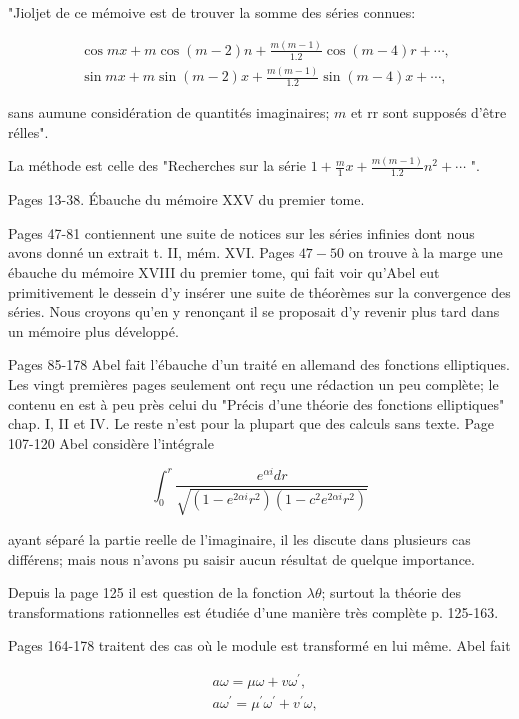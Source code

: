 \documentclass{article}
\begin{document}
"Jioljet de ce mémoive est de trouver la somme des séries connues:

\[
\begin{aligned}
& \cos m x+m \cos (m-2) n+\frac{m(m-1)}{1.2} \cos (m-4) r+\cdots, \\
& \sin m x+m \sin (m-2) x+\frac{m(m-1)}{1.2} \sin (m-4) x+\cdots,
\end{aligned}
\]

sans aumune considération de quantités imaginaires; \(m\) et rr sont supposés d'être rélles".

La méthode est celle des "Recherches sur la série \(1+\frac{m}{1} x+\frac{m(m-1)}{1.2} n^{2}+\cdots\) ".

Pages 13-38. Ébauche du mémoire XXV du premier tome.

Pages 47-81 contiennent une suite de notices sur les séries infinies dont nous avons donné un extrait t. II, mém. XVI. Pages \(47-50\) on trouve à la marge une ébauche du mémoire XVIII du premier tome, qui fait voir qu'Abel eut primitivement le dessein d'y insérer une suite de théorèmes sur la convergence des séries. Nous croyons qu'en y renonçant il se proposait d'y revenir plus tard dans un mémoire plus développé.

Pages 85-178 Abel fait l'ébauche d'un traité en allemand des fonctions elliptiques. Les vingt premières pages seulement ont reçu une rédaction un peu complète; le contenu en est à peu près celui du "Précis d'une théorie des fonctions elliptiques" chap. I, II et IV. Le reste n'est pour la plupart que des calculs sans texte. Page 107-120 Abel considère l'intégrale

\[
\int_{0}^{r} \frac{e^{\alpha i} d r}{\sqrt{\left(1-e^{2 \alpha i} r^{2}\right)\left(1-c^{2} e^{2 \alpha i} r^{2}\right)}}
\]

ayant séparé la partie reelle de l'imaginaire, il les discute dans plusieurs cas différens; mais nous n'avons pu saisir aucun résultat de quelque importance.

Depuis la page 125 il est question de la fonction \(\lambda \theta\); surtout la théorie des transformations rationnelles est étudiée d'une manière très complète p. 125-163.

Pages 164-178 traitent des cas où le module est transformé en lui même. Abel fait

\[
\begin{aligned}
& a \omega=\mu \omega+v \omega^{\prime}, \\
& a \omega^{\prime}=\mu^{\prime} \omega^{\prime}+v^{\prime} \omega,
\end{aligned}
\]
\end{document}

